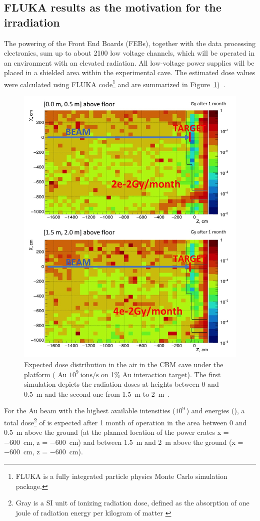 \subsection{FLUKA results as the motivation for the irradiation}

The powering of the Front End Boards (\glspl{FEB}), together with the data processing electronics, sum up to about 2100 low voltage channels, which will be operated in an environment with an elevated radiation. All low-voltage power supplies will be placed in a shielded area within the experimental cave. The estimated dose values were calculated using FLUKA code\footnote{FLUKA is a fully integrated particle physics Monte Carlo simulation package.} and are summarized in Figure~\ref{fig:mCBM})~\cite{FLUKA}. 

\begin{figure}[!h]
    \centering
    \includegraphics[width=0.7\columnwidth]{Chapter4/images/Dose00.jpg}
    \caption{Expected dose distribution in the air in the \gls{CBM}
cave under the platform ( Au $10^{9} \mathrm{\ ions/s}$ on 1\% Au
interaction target). The first simulation depicts the radiation doses at heights between 0 and \SI{0.5}{\metre} and the second one from \SI{1.5}{\metre} to \SI{2}{\metre}~\cite{fluka_senger}.} 
    \label{fig:mCBM}
\end{figure}
For the Au beam with the highest available intensities 
($10^{9}\,$\ionss) and energies 
(), a total dose\footnote{Gray is a SI unit of ionizing radiation dose, defined as the absorption of one joule of radiation energy per kilogram of matter \cite{gray}} of  is expected after 1 month of operation in the area between 0 and \SI{0.5}{\metre} above the ground (at the planned location of the power crates x = \SI{-600}{\centi\metre}, z = \SI{-600}{\centi\metre}) and  between \SI{1.5}{\metre} and \SI{2}{\metre} above the ground (x = \SI{-600}{\centi\metre}, z = \SI{-600}{\centi\metre}).

